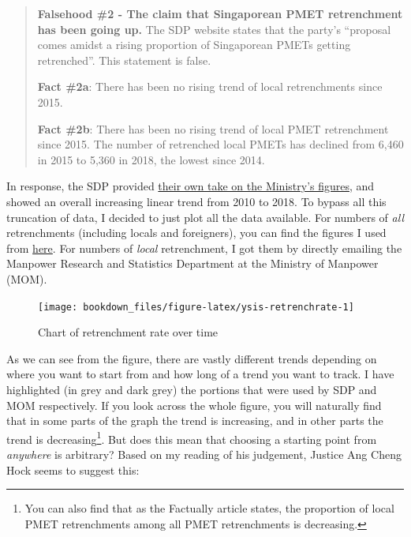 \documentclass[
  openany]{book}
\begin{document}
\begin{quote}
\textbf{Falsehood \#2 - The claim that Singaporean PMET retrenchment has been going up.}
The SDP website states that the party's ``proposal comes amidst a rising proportion of Singaporean PMETs getting retrenched''. This statement is false.

\textbf{Fact \#2a}: There has been no rising trend of local retrenchments since 2015.

\textbf{Fact \#2b}: There has been no rising trend of local PMET retrenchment since 2015. The number of retrenched local PMETs has declined from 6,460 in 2015 to 5,360 in 2018, the lowest since 2014.
\end{quote}

In response, the SDP provided \href{https://yoursdp.org/news/sdp-calls-on-josephine-teo-to-retract-correction-directions-and-apologise,-cites-mom's-own-statistics-to-prove-she's-wrong\#site-menu}{their own take on the Ministry's figures}, and showed an overall increasing linear trend from 2010 to 2018. To bypass all this truncation of data, I decided to just plot all the data available. For numbers of \emph{all} retrenchments (including locals and foreigners), you can find the figures I used from \href{https://stats.mom.gov.sg/Pages/RetrenchmentTimeSeries.aspx}{here}. For numbers of \emph{local} retrenchment, I got them by directly emailing the Manpower Research and Statistics Department at the Ministry of Manpower (MOM).

\begin{figure}

{\centering \texttt{[image: bookdown\_files/figure-latex/ysis-retrenchrate-1]} 

}

\caption{Chart of retrenchment rate over time}\label{fig:ysis-retrenchrate}
\end{figure}

As we can see from the figure, there are vastly different trends depending on where you want to start from and how long of a trend you want to track. I have highlighted (in grey and dark grey) the portions that were used by SDP and MOM respectively. If you look across the whole figure, you will naturally find that in some parts of the graph the trend is increasing, and in other parts the trend is decreasing\footnote{You can also find that as the Factually article states, the proportion of local PMET retrenchments among all PMET retrenchments is decreasing.}. But does this mean that choosing a starting point from \emph{anywhere} is arbitrary? Based on my reading of his judgement, Justice Ang Cheng Hock seems to suggest this:
\end{document}
